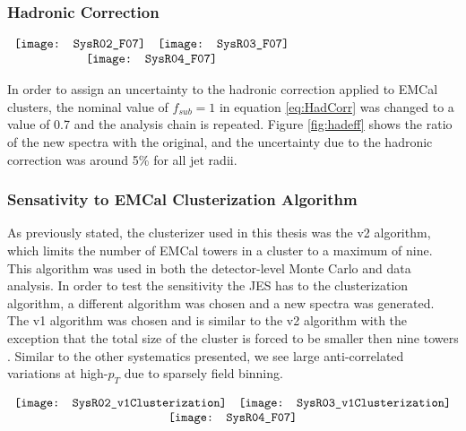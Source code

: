 \subsubsection{Hadronic Correction}

\begin{figure*}[t!]
$\begin{array}{rl}
    \texttt{[image: SysR02\_F07]} &
    \texttt{[image: SysR03\_F07]}\\
    \multicolumn{2}{c}{\texttt{[image: SysR04\_F07]}}
\end{array}$
\caption[Systematic due to Hadronic correction.]{\label{fig:hadeff}Systematic due to hadronic correction efficiency; R = 0.2 \textit{(top left)}, R = 0.3 \textit{(top right)}, R = 0.4 \textit{(bottom)}.}
\end{figure*}

In order to assign an uncertainty to the hadronic correction applied to EMCal clusters, the nominal value of $f_{sub} = 1$ in equation \ref{eq:HadCorr} was changed to a value of 0.7 and the analysis chain is repeated.  Figure \ref{fig:hadeff} shows the ratio of the new spectra with the original, and the uncertainty due to the hadronic correction was around 5\% for all jet radii.

\subsubsection{Sensativity to EMCal Clusterization Algorithm}
As previously stated, the clusterizer used in this thesis was the v2 algorithm, which limits the number of EMCal towers in a cluster to a maximum of nine. This algorithm was used in both the detector-level Monte Carlo and data analysis.  In order to test the sensitivity the JES has to the clusterization algorithm, a different algorithm was chosen and a new spectra was generated.  The v1 algorithm was chosen and is similar to the v2 algorithm with the exception that the total size of the cluster is forced to be smaller then nine towers .  Similar to the other systematics presented, we see large anti-correlated variations at high-$p_{T}$ due to sparsely field binning.  

\begin{figure*}[t!]
$\begin{array}{rl}
    \texttt{[image: SysR02\_v1Clusterization]} &
    \texttt{[image: SysR03\_v1Clusterization]}\\
    \multicolumn{2}{c}{\texttt{[image: SysR04\_F07]}}
\end{array}$
\caption[Systematic due to clusterization algorithm.]{\label{fig:cluseff}Systematic due to EMCal clusterization algorithm; R = 0.2 \textit{(top left)}, R = 0.3 \textit{(top right)}, R = 0.4 \textit{(bottom)}.}
\end{figure*}

